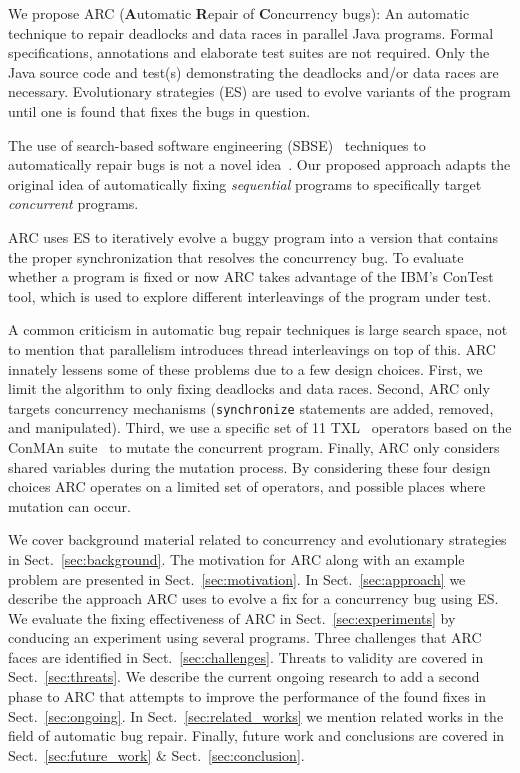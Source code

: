 \documentclass{llncs}
\begin{document}
We propose ARC (\textbf{A}utomatic \textbf{R}epair of \textbf{C}oncurrency
bugs): An automatic technique to repair deadlocks and data races in parallel
Java programs. Formal specifications, annotations and elaborate test suites are
not required. Only the Java source code and test(s) demonstrating the deadlocks
and/or data races are necessary. Evolutionary strategies (ES) are used to evolve
variants of the program until one is found that fixes the bugs in question.

The use of search-based software engineering (SBSE)~\cite{Har+10} techniques to
automatically repair bugs is not a novel idea~\cite{FNWG09, WNLF09, NWLF09, WFGN10, GNFW11, LDFW12}. Our proposed approach adapts the original idea of
automatically fixing \textit{sequential} programs to specifically target
\textit{concurrent} programs.

ARC uses ES to iteratively evolve a buggy program into a version that contains
the proper synchronization that resolves the concurrency bug. To evaluate
whether a program is fixed or now ARC takes advantage of the IBM's
ConTest~\cite{EFN+02} tool, which is used to explore different interleavings of
the program under test.

A common criticism in automatic bug repair techniques is large search space,
not to mention that parallelism introduces thread interleavings on top of this.
ARC innately lessens some of these problems due to a few design choices. First,
we limit the algorithm to only fixing deadlocks and data races. Second, ARC
only targets concurrency mechanisms (\texttt{synchronize} statements are added,
removed, and manipulated). Third, we use a specific set of 11
TXL~\cite{CHP91} operators based on the ConMAn suite~\cite{BCD06} to mutate the
concurrent program.  Finally, ARC only considers shared variables during the
mutation process. By considering these four design choices ARC operates on a
limited set of operators, and possible places where mutation can occur.

We cover background material related to concurrency and evolutionary strategies
in Sect.~\ref{sec:background}. The motivation for ARC along with an example
problem are presented in Sect.~\ref{sec:motivation}. In
Sect.~\ref{sec:approach} we describe the approach ARC uses to evolve a fix for
a concurrency bug using ES. We evaluate the fixing effectiveness of ARC in
Sect.~\ref{sec:experiments} by conducing an experiment using several programs.
Three challenges that ARC faces are identified in Sect.~\ref{sec:challenges}.
Threats to validity are covered in Sect.~\ref{sec:threats}. We describe the current
ongoing research to add a second phase to ARC that attempts to improve the
performance of the found fixes in Sect.~\ref{sec:ongoing}. In
Sect.~\ref{sec:related_works} we mention related works in the field of
automatic bug repair. Finally, future work and conclusions are covered in
Sect.~\ref{sec:future_work} \& Sect.~\ref{sec:conclusion}.
\end{document}
